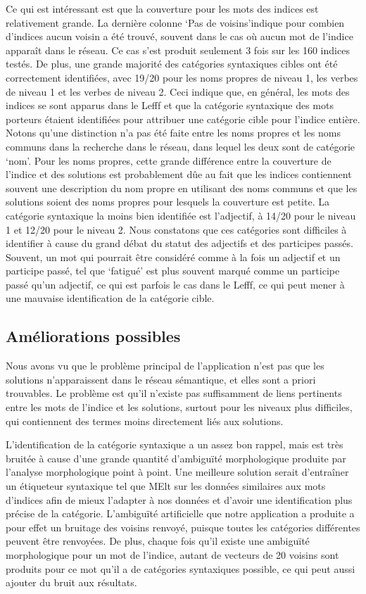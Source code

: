 {Ce qui est intéressant est que la couverture pour les mots des indices est relativement grande. La dernière colonne \lq{Pas de voisins}\rq indique pour combien d'indices aucun voisin a été trouvé, souvent dans le cas où aucun mot de l'indice apparaît dans le réseau. Ce cas s'est produit seulement 3 fois sur les 160 indices testés. De plus, une grande majorité des catégories syntaxiques cibles ont été correctement identifiées, avec 19/20 pour les noms propres de niveau 1, les verbes de niveau 1 et les verbes de niveau 2. Ceci indique que, en général, les mots des indices se sont apparus dans le Lefff et que la catégorie syntaxique des mots porteurs étaient identifiées pour attribuer une catégorie cible pour l'indice entière. Notons qu'une distinction n'a pas été faite entre les noms propres et les noms communs dans la recherche dans le réseau, dans lequel les deux sont de catégorie \lq{nom}\rq. Pour les noms propres, cette grande différence entre la couverture de l'indice et des solutions est probablement dûe au fait que les indices contiennent souvent une description du nom propre en utilisant des noms communs et que les solutions soient des noms propres pour lesquels la couverture est petite. La catégorie syntaxique la moins bien identifiée est l'adjectif, à 14/20 pour le niveau 1 et 12/20 pour le niveau 2. Nous constatons que ces catégories sont difficiles à identifier à cause du grand débat du statut des adjectifs et des participes passés. Souvent, un mot qui pourrait être considéré comme à la fois un adjectif et un participe passé, tel que \lq{fatigué}\rq{} est plus souvent marqué comme un participe passé qu'un adjectif, ce qui est parfois le cas dans le Lefff, ce qui peut mener à une mauvaise identification de la catégorie cible. 
   
\subsection{Améliorations possibles}
Nous avons vu que le problème principal de l'application n'est pas que les solutions n'apparaissent dans le réseau sémantique, et elles sont a priori trouvables. Le problème est qu'il n'existe pas suffisamment de liens pertinents entre les mots de l'indice et les solutions, surtout pour les niveaux plus difficiles, qui contiennent des termes moins directement liés aux solutions.

L'identification de la catégorie syntaxique a un assez bon rappel, mais est très bruitée à cause d'une grande quantité d'ambiguïté morphologique produite par l'analyse morphologique point à point. Une meilleure solution serait d'entraîner un étiqueteur syntaxique tel que MElt sur les données similaires aux mots d'indices afin de mieux l'adapter à nos données et d'avoir une identification plus précise de la catégorie. L'ambiguïté artificielle que notre application a produite a pour effet un bruitage des voisins renvoyé, puisque toutes les catégories différentes peuvent être renvoyées. De plus, chaque fois qu'il existe une ambiguïté morphologique pour un mot de l'indice, autant de vecteurs de 20 voisins sont produits pour ce mot qu'il a de catégories syntaxiques possible, ce qui peut aussi ajouter du bruit aux résultats.

}
